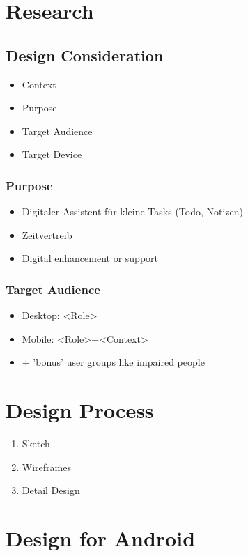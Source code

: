 \documentclass{report}
\theoremstyle{definition}
\theoremstyle{example}
\begin{document}
\section{Research}
\subsection{Design Consideration}
\begin{itemize}
   \item Context
   \item Purpose
   \item Target Audience
   \item Target Device
\end{itemize}

\subsubsection{Purpose}
\begin{itemize}
   \item Digitaler Assistent für kleine Tasks (Todo, Notizen)
   \item Zeitvertreib
   \item Digital enhancement or support
\end{itemize}

\subsubsection{Target Audience}
\begin{itemize}
   \item Desktop: <Role>
   \item Mobile: <Role>+<Context>
   \item + 'bonus' user groups like impaired people
\end{itemize}

\section{Design Process}
\begin{enumerate}
   \item Sketch
   \item Wireframes
   \item Detail Design
\end{enumerate}

\section{Design for Android}
\end{document}
